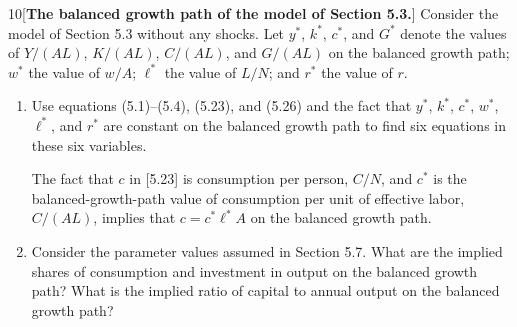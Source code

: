 \begin{problem}{10}[\textbf{The balanced growth path of the model of Section 5.3.}]
Consider the model of Section 5.3 without any shocks. Let \(y^*\), \(k^*\), \(c^*\), and \(G^*\) denote the values of \(Y/\left(AL\right)\), \(K/\left(AL\right)\), \(C/\left(AL\right)\), and \(G/\left(AL\right)\) on the balanced growth path; \(w^*\) the value of \(w/A\); \(\ell^*\) the value of \(L/N\); and \(r^*\) the value of \(r\).
\begin{enumerate}[label=(\alph*)]
    \item Use equations (5.1)--(5.4), (5.23), and (5.26) and the fact that \(y^*\), \(k^*\), \(c^*\), \(w^*\), \(\ell^*\), and \(r^*\) are constant on the balanced growth path to find six equations in these six variables.
    \par {} The fact that \(c\) in [5.23] is consumption per person, \(C/N\), and \(c^*\) is the balanced-growth-path value of consumption per unit of effective labor, \(C/\left(AL\right)\), implies that \(c=c^*\ell^*A\) on the balanced growth path.
    \item Consider the parameter values assumed in Section 5.7. What are the implied shares of consumption and investment in output on the balanced growth path? What is the implied ratio of capital to annual output on the balanced growth path?
\end{enumerate}
\end{problem}

